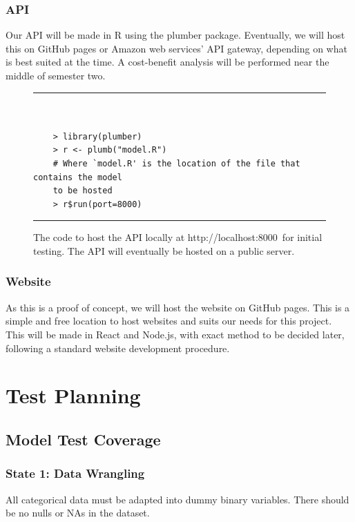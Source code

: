 \documentclass[a4paper, 12pt]{article}
\begin{document}
        \subsubsection{API}
        Our API will be made in R using the plumber package. Eventually, we will host this on GitHub pages or Amazon web services' API gateway, depending on what is best suited at the time. A cost-benefit analysis will be performed near the middle of semester two.
        
        \begin{figure}[h]
        \hrule  %
        \begin{verbatim}
        
        
    > library(plumber)
    > r <- plumb("model.R")  
    # Where `model.R' is the location of the file that contains the model 
    to be hosted
    > r$run(port=8000)
        \end{verbatim}
        \hrule
        \caption{The code to host the API locally at http://localhost:8000\, for initial testing. The API will eventually be hosted on a public server.}
        \end{figure}
        
        \subsubsection{Website}
        As this is a proof of concept, we will host the website on GitHub pages. This is a simple and free location to host websites and suits our needs for this project. This will be made in React and Node.js, with exact method to be decided later, following a standard website development procedure. 
        

\section{Test Planning}
    \subsection{Model Test Coverage}
        \subsubsection{State 1: Data Wrangling}
        All categorical data must be adapted into dummy binary variables. There should be no nulls or NAs in the dataset.
        
\end{document}
